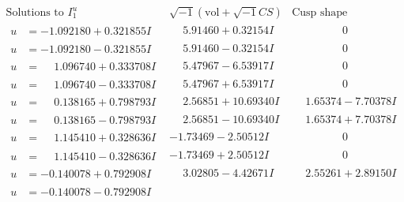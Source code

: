 \documentclass[1p]{elsarticle_modified}
\theoremstyle{definition}
\newcommand{\I}{\sqrt{-1}}
\begin{document}
$$\begin{array}{c|c|c}  
\text{Solutions to }I^u_{1}& \I (\text{vol} + \sqrt{-1}CS) & \text{Cusp shape}\\
 \hline 
\begin{aligned}
u &= -1.092180 + 0.321855 I\end{aligned}
 & \phantom{-}5.91460 + 0.32154 I & \phantom{-0.000000 } 0 \\ \hline\begin{aligned}
u &= -1.092180 - 0.321855 I\end{aligned}
 & \phantom{-}5.91460 - 0.32154 I & \phantom{-0.000000 } 0 \\ \hline\begin{aligned}
u &= \phantom{-}1.096740 + 0.333708 I\end{aligned}
 & \phantom{-}5.47967 - 6.53917 I & \phantom{-0.000000 } 0 \\ \hline\begin{aligned}
u &= \phantom{-}1.096740 - 0.333708 I\end{aligned}
 & \phantom{-}5.47967 + 6.53917 I & \phantom{-0.000000 } 0 \\ \hline\begin{aligned}
u &= \phantom{-}0.138165 + 0.798793 I\end{aligned}
 & \phantom{-}2.56851 + 10.69340 I & \phantom{-}1.65374 - 7.70378 I \\ \hline\begin{aligned}
u &= \phantom{-}0.138165 - 0.798793 I\end{aligned}
 & \phantom{-}2.56851 - 10.69340 I & \phantom{-}1.65374 + 7.70378 I \\ \hline\begin{aligned}
u &= \phantom{-}1.145410 + 0.328636 I\end{aligned}
 & -1.73469 - 2.50512 I & \phantom{-0.000000 } 0 \\ \hline\begin{aligned}
u &= \phantom{-}1.145410 - 0.328636 I\end{aligned}
 & -1.73469 + 2.50512 I & \phantom{-0.000000 } 0 \\ \hline\begin{aligned}
u &= -0.140078 + 0.792908 I\end{aligned}
 & \phantom{-}3.02805 - 4.42671 I & \phantom{-}2.55261 + 2.89150 I \\ \hline\begin{aligned}
u &= -0.140078 - 0.792908 I\end{aligned}

\end{array}$$
\end{document}
